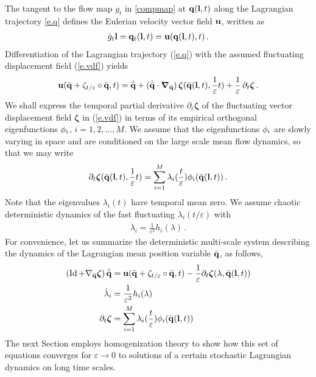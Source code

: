 \documentclass[12pt,onesided]{article}
\def\eps{\varepsilon}
\def\q{{\bf{q}}}
\def\l{{\bf{l}}}
\def\MM#1{{\bf{#1}}}
\def\bphi{{\MM{\phi}}}
\def\u{{\bf{u}}}
\def\bzeta{{\bm{\zeta}}}
\newcommand*{\Id}{\operatorname{Id}}
\begin{document}
The tangent to the flow map $g_t$ in \eqref{compmap} at $\q(\l,t)$ along the Lagrangian trajectory \eqref{e.q} defines the Eulerian velocity vector field $\u$, written as
\begin{align}
\dot{g}_t\l = {\q}_t(\l,t) = \u(\q(\l,t),t)\, .
\end{align}
Differentiation of the Lagrangian trajectory (\ref{e.q}) with the assumed fluctuating displacement field (\ref{e.vdf}) yields 
\begin{align}
\u(\bar\q +\zeta_{t/\eps}\circ \bar \q,t) = {\dot{\bar{\q}}}
+  ({\dot{\bar{\q}}}\cdot {\bm{\nabla}_{\bar\q}})\,\bzeta(\bar\q(\l,t),\frac{1}{\eps}t)+ \frac{1}{\eps}\, \partial_t\bzeta \, .
\label{e.qdot}
\end{align}
We shall express the temporal partial derivative $\partial_t\bzeta$ of the fluctuating vector displacement field $\bzeta$ in (\ref{e.vdf}) in terms of its empirical orthogonal eigenfunctions $\bphi_i$, $i=1,2,\dots,M$. We assume that the eigenfunctions $\bphi_i$ are slowly varying in space and are conditioned on the large scale mean flow dynamics, so that we may  write
\begin{align}
\partial_t \bzeta (\bar\q(\l,t),\frac{1}{\eps}t) = 
\sum_{i=1}^{M} \lambda_i(\frac{t}{\eps})\bphi_i(\bar\q(\l,t))
\, .
\label{e.xidot}
\end{align}
Note that the eigenvalues $\lambda_i(t)$ have temporal mean zero. We assume chaotic deterministic  dynamics of the fast fluctuating $\lambda_i(t/\eps)$ with
\begin{align}
\dot \lambda_i = \frac{1}{\eps^2}h_i(\lambda)\, .
\label{e.lambda}
\end{align}
For convenience, let us summarize the deterministic multi-scale system describing the dynamics of the Lagrangian mean position variable $\bar\q$, as follows,
\begin{align}
(\Id + \nabla_{\bar\q}\bzeta)\, {\dot{\bar\q}}&=\u(\bar\q+\zeta_{t/\eps}\circ\bar\q,t)-\frac{1}{\eps}\partial_t\bzeta(\lambda,\bar\q(\l,t))
\label{e.ms1}
\\
\dot\lambda_i&=\frac{1}{\eps^2}h_i(\lambda)
\label{e.ms2}
\\
\partial_t\bzeta&=\sum_{i=1}^{M} \lambda_i(\frac{t}{\eps})\bphi_i(\bar\q(\l,t))
\label{e.ms3}
\end{align}
The next Section employs homogenization theory to show how this set of equations converges for $\eps\to 0$ to solutions of a certain stochastic Lagrangian dynamics on long time scales.

\end{document}
